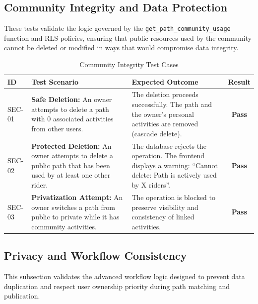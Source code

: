 \subsection{Community Integrity and Data Protection}

These tests validate the logic governed by the \texttt{get\_path\_community\_usage} function and RLS policies, ensuring that public resources used by the community cannot be deleted or modified in ways that would compromise data integrity.

\begin{table}[H]
\centering
\renewcommand{\arraystretch}{1.5}
\begin{tabular}{|l|p{6cm}|p{6cm}|c|}
\hline
\textbf{ID} & \textbf{Test Scenario} & \textbf{Expected Outcome} & \textbf{Result} \\
\hline
SEC-01 & \textbf{Safe Deletion:} An owner attempts to delete a path with 0 associated activities from other users. & The deletion proceeds successfully. The path and the owner's personal activities are removed (cascade delete). & \textbf{Pass} \\
\hline
SEC-02 & \textbf{Protected Deletion:} An owner attempts to delete a public path that has been used by at least one other rider. & The database rejects the operation. The frontend displays a warning: ``Cannot delete: Path is actively used by X riders''. & \textbf{Pass} \\
\hline
SEC-03 & \textbf{Privatization Attempt:} An owner switches a path from public to private while it has community activities. & The operation is blocked to preserve visibility and consistency of linked activities. & \textbf{Pass} \\
\hline
\end{tabular}
\caption{Community Integrity Test Cases}
\label{tab:integrity_tests}
\end{table}

\subsection{Privacy and Workflow Consistency}

This subsection validates the advanced workflow logic designed to prevent data duplication and respect user ownership priority during path matching and publication.

